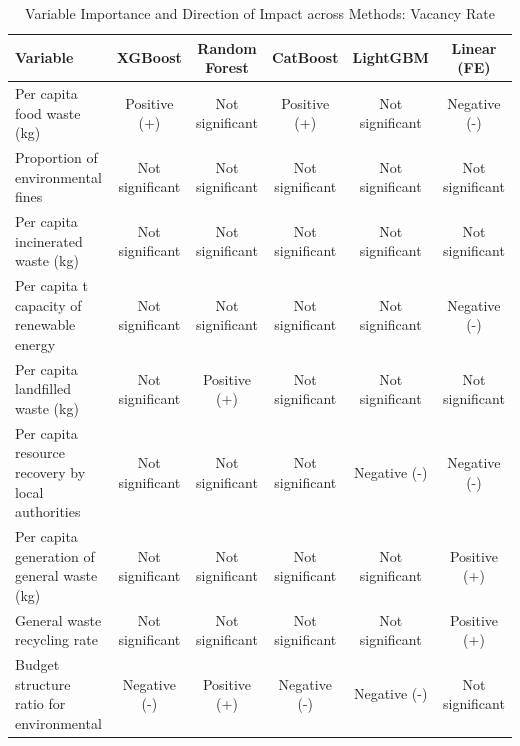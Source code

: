 \documentclass{article}
\begin{document}
\begin{table}[H]
\centering
\tiny
\caption{Variable Importance and Direction of Impact across Methods: Vacancy Rate}
\label{tab:var_impact_summary_2}
\begin{tabular}{lccccc}
\toprule
\textbf{Variable} & \textbf{XGBoost} & \textbf{Random Forest} & \textbf{CatBoost} & \textbf{LightGBM} & \textbf{Linear (FE)} \\
\midrule
Per capita food waste (kg) & Positive (+) & Not significant & Positive (+) & Not significant & Negative (-) \\
Proportion of environmental fines & Not significant & Not significant & Not significant & Not significant & Not significant \\
Per capita incinerated waste (kg) & Not significant & Not significant & Not significant & Not significant & Not significant \\
Per capita t capacity of renewable energy & Not significant & Not significant & Not significant & Not significant & Negative (-) \\
Per capita landfilled waste (kg) & Not significant & Positive (+) & Not significant & Not significant & Not significant \\
Per capita resource recovery by local authorities & Not significant & Not significant & Not significant & Negative (-) & Negative (-) \\
Per capita generation of general waste (kg) & Not significant & Not significant & Not significant & Not significant & Positive (+) \\
General waste recycling rate & Not significant & Not significant & Not significant & Not significant & Positive (+) \\
Budget structure ratio for environmental & Negative (-) & Positive (+) & Negative (-) & Negative (-) & Not significant \\
\bottomrule
\end{tabular}
\end{table}
\end{document}
